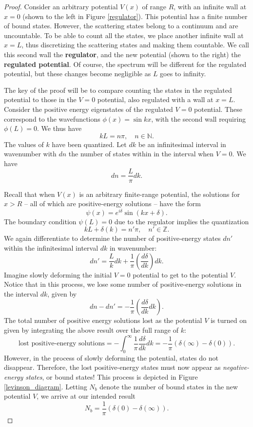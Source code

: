 \begin{proof}
    Consider an arbitrary potential $V(x)$ of range $R$, with an infinite wall at $x=0$ (shown to the left in Figure \ref{regulator}). This potential has a finite number of bound states. However, the scattering states belong to a continuum and are uncountable. To be able to count all the states, we place another infinite wall at $x=L$, thus discretizing the scattering states and making them countable. We call this second wall the \textbf{regulator}, and the new potential (shown to the right) the \textbf{regulated potential}. Of course, the spectrum will be different for the regulated potential, but these changes become negligible as $L$ goes to infinity.

    The key of the proof will be to compare counting the states in the regulated potential to those in the $V=0$ potential, also regulated with a wall at $x=L$. Consider the positive energy eigenstates of the regulated $V=0$ potential. These correspond to the wavefunctions $\phi(x)=\sin kx$, with the second wall requiring $\phi(L)=0$. We thus have $$kL=n\pi,\quad n\in\mathbb{N}.$$The values of $k$ have been quantized. Let $dk$ be an infinitesimal interval in wavenumber with $dn$ the number of states within in the interval when $V=0$. We have $$dn=\frac{L}{\pi}dk.$$
    
    Recall that when $V(x)$ is an arbitrary finite-range potential, the solutions for $x>R$ -- all of which are positive-energy solutions -- have the form $$\psi(x)=e^{i\delta}\sin(kx+\delta).$$The boundary condition $\psi(L)=0$ due to the regulator implies the quantization $$kL+\delta(k)=n'\pi,\quad n'\in\mathbb{Z}.$$We again differentiate to determine the number of positive-energy states $dn'$ within the infinitesimal interval $dk$ in wavenumber: $$dn'=\frac{L}{k}dk+\frac{1}{\pi}(\frac{d\delta}{dk})dk.$$Imagine slowly deforming the initial $V=0$ potential to get to the potential $V$. Notice that in this process, we lose some number of positive-energy solutions in the interval $dk$, given by $$dn-dn'=-\frac{1}{\pi}(\frac{d\delta}{dk}dk).$$The total number of positive energy solutions lost as the potential $V$ is turned on given by integrating the above result over the full range of $k$: $$\text{lost positive-energy solutions}=-\int_0^\infty\frac{1}{\pi}\frac{d\delta}{dk}dk=-\frac{1}{\pi}(\delta(\infty)-\delta(0)).$$However, in the process of slowly deforming the potential, states do not disappear. Therefore, the lost positive-energy states must now appear as \textit{negative-energy states}, or bound states! This process is depicted in Figure \ref{levinson_diagram}. Letting $N_b$ denote the number of bound states in the new potential $V$, we arrive at our intended result $$N_b=\frac{1}{\pi}(\delta(0)-\delta(\infty)).$$
\end{proof}

